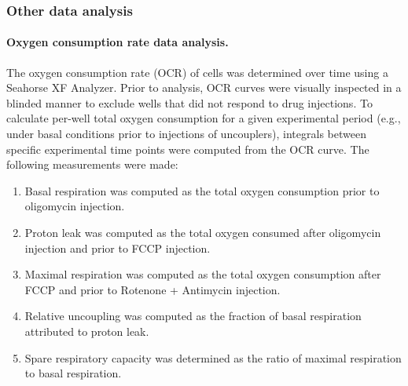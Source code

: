\subsubsection{Other data analysis}

\paragraph{Oxygen consumption rate data analysis.}
The oxygen consumption rate (OCR) of cells was determined over time using a Seahorse XF Analyzer. Prior to analysis, OCR curves were visually inspected in a blinded manner to exclude wells that did not respond to drug injections. To calculate per-well total oxygen consumption for a given experimental period (e.g., under basal conditions prior to injections of uncouplers), integrals between specific experimental time points were computed from the OCR curve. The following measurements were made:
\begin{enumerate}
    \item Basal respiration was computed as the total oxygen consumption prior to oligomycin injection.
    \item Proton leak was computed as the total oxygen consumed after oligomycin injection and prior to FCCP injection.
    \item Maximal respiration was computed as the total oxygen consumption after FCCP and prior to Rotenone + Antimycin injection.
    \item Relative uncoupling was computed as the fraction of basal respiration attributed to proton leak.
    \item Spare respiratory capacity was determined as the ratio of maximal respiration to basal respiration.
\end{enumerate}